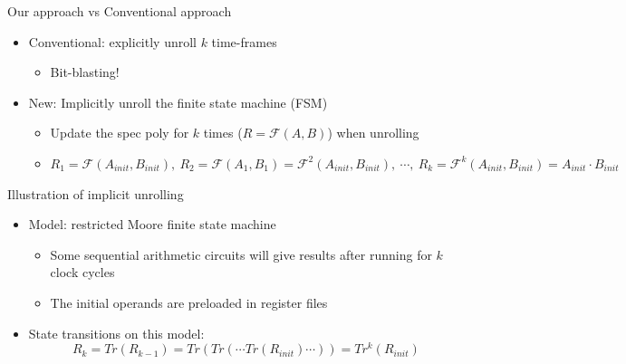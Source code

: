 \documentclass[xcolor=dvipsnames]{beamer}
\newcommand{\bi}{\begin{itemize}}
\newcommand{\ei}{\end{itemize}}
\newcommand{\F}{{\mathcal{F}}}
\begin{document}
\begin{frame}{\large{Our approach vs Conventional approach}}
\vspace{-0.1in}
\begin{figure}[H]
\end{figure}
\vspace{-0.4in}
\bi
\item Conventional: explicitly unroll $k$ time-frames
	\bi
	\item Bit-blasting!
	\ei
\item New: \alert{Implicitly} unroll the finite state machine (FSM)
	\bi
	\item Update the spec poly for $k$ times ($R = \F(A,B)$) when unrolling
	\item $R_1 = \F(A_{init},B_{init}),~R_2 = \F(A_{1},B_{1}) = \F^2(A_{init},B_{init}),~ 
	\cdots, ~ R_k = \F^k(A_{init},B_{init}) = A_{init}\cdot B_{init}$
	\ei
\ei
\end{frame}
\begin{frame}{\large{Illustration of implicit unrolling}}
\vspace{-0.1in}
\begin{figure}[hbt]
\end{figure}
\vspace{-0.2in}
\bi
\item Model: restricted Moore finite state machine
	\bi
	\item Some sequential arithmetic circuits will give results after running for $k$ clock cycles
	\item The initial operands are preloaded in register files
	\ei
\item State transitions on this model:
$$R_{k} = Tr(R_{k-1}) = Tr(Tr(\cdots Tr(R_{init})\cdots)) = Tr^k(R_{init})$$
\ei
\end{frame}
\end{document}
